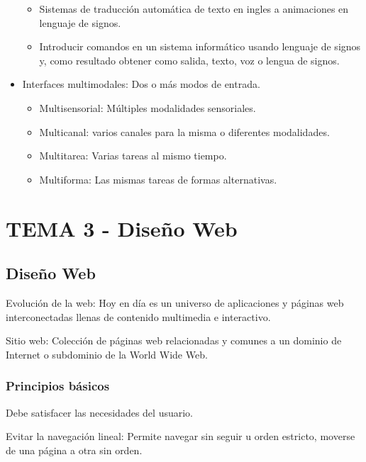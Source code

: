 \documentclass[12pt, twoside, openright]{report} %
\begin{document}
\begin{itemize}
    \begin{itemize}
    
    \item
      Sistemas de traducción automática de texto en ingles a animaciones
      en lenguaje de signos.
    \item
      Introducir comandos en un sistema informático usando lenguaje de
      signos y, como resultado obtener como salida, texto, voz o lengua
      de signos.
    \end{itemize}
  \item
    Interfaces multimodales: Dos o más modos de entrada.

    \begin{itemize}
    
    \item
      Multisensorial: Múltiples modalidades sensoriales.
    \item
      Multicanal: varios canales para la misma o diferentes modalidades.
    \item
      Multitarea: Varias tareas al mismo tiempo.
    \item
      Multiforma: Las mismas tareas de formas alternativas.
    \end{itemize}
  \end{itemize}

\chapter{TEMA 3 - Diseño Web}
\section{Diseño Web}

Evolución de la web: Hoy en día es un universo de aplicaciones y
páginas web interconectadas llenas de contenido multimedia e
interactivo.

Sitio web: Colección de páginas web relacionadas y comunes a un
dominio de Internet o subdominio de la World Wide Web.

\subsection{Principios básicos}


    Debe satisfacer las necesidades del usuario.

    Evitar la navegación lineal: Permite navegar sin seguir u orden
    estricto, moverse de una página a otra sin orden.
  
\end{document}
